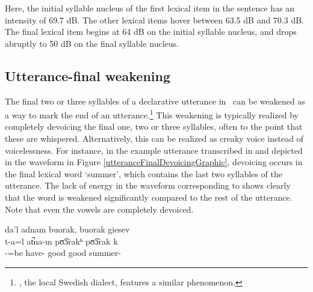 Here, the initial syllable nucleus of the first lexical item in the sentence 
 has an intensity of 69.7 dB. The other lexical items hover between 63.5 dB and 70.3 dB. The final lexical item  begins at 64 dB on the initial syllable nucleus, and drops abruptly to 50 dB on the final syllable nucleus. 


\subsection{Utterance-final weakening}\label{utteranceFinalDevoicing}
The final two or three syllables of a declarative utterance in \PS\ can be weakened as a way to mark the end of an utterance.\footnote{, the local Swedish dialect, features a similar phenomenon.} 
This weakening is typically realized by completely devoicing the final one, two or three syllables, often to the point that these are whispered. Alternatively, this can be realized as creaky voice instead of voicelessness. For instance, in the example utterance transcribed in  and depicted in the waveform in Figure \vref{utteranceFinalDevoicingGraphic}, devoicing occurs in the final lexical word  ‘summer’, which contains the last two syllables of the utterance. 
The lack of energy in the waveform corresponding to  shows clearly that the word is weakened significantly compared to the rest of the utterance. Note that even the vowels are completely devoiced.

\ea\label{utteranceFinalDevoicing1}%
\glll	da’l adnam buorak, buorak giesev\\
	t-a=l at̚na-m pʊ͡ɔrakʰ pʊ͡ɔrak k\\
	-=be\BS{} have- good good summer-\\\nopagebreak
{} 
\z

